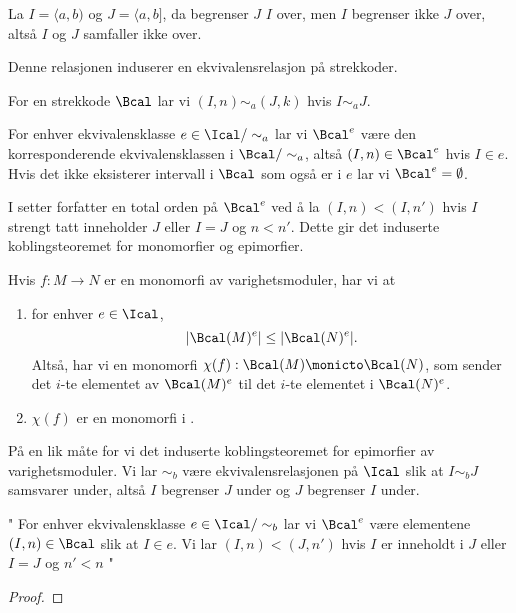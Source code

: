 \begin{bemerk}
  La $I = \langle a,b)$ og $J = \langle a,b]$, da
  begrenser $J$ $I$ over, men $I$ begrenser ikke $J$ over,
  altså $I$ og $J$ samfaller ikke over.
\end{bemerk}

Denne relasjonen induserer en ekvivalensrelasjon på
strekkoder.

\begin{definisjon}\label{def:EkRelBarc}
  For en strekkode $\Bcal$ lar vi $(I,n)\sim_a (J,k)$ hvis
  $I\sim_a J$.
\end{definisjon}

For enhver ekvivalensklasse $e\in\Ical/\sim_a$ lar vi
$\Bcal^e$ være den korresponderende ekvivalensklassen
i $\Bcal/\sim_a$, altså $(I,n)\in\Bcal^e$ hvis $I\in e$.
Hvis det ikke eksisterer intervall i $\Bcal$ som også er
i $e$ lar vi $\Bcal^e=\emptyset$.

I \citep[seksjon 3.2]{Bauer2020} setter forfatter en total orden
på $\Bcal^e$ ved å la $(I,n) < (I,n')$ hvis $I$ strengt tatt
inneholder $J$ eller $I=J$ og $n<n'$. Dette gir det induserte
koblingsteoremet for monomorfier og epimorfier.

\begin{proposisjon}
Hvis $f:M\to N$ er en monomorfi av varighetsmoduler, har vi at
\begin{enumerate}
  \item for enhver $e\in\Ical$,
    \[|\Bcal(M)^e|\leq|\Bcal(N)^e|.\]
    Altså, har vi en monomorfi $\chi(f):\Bcal(M)\monicto\Bcal(N)$,
    som sender det $i$-te elementet av $\Bcal(M)^e$ til det $i$-te
    elementet i $\Bcal(N)^e$.
  \item $\chi(f)$ er en monomorfi i \Barc.
\end{enumerate}
\end{proposisjon}

På en lik måte for vi det induserte koblingsteoremet for
epimorfier av varighetsmoduler. Vi lar $\sim_b$ være
ekvivalensrelasjonen på $\Ical$ slik at $I\sim_b J$
samsvarer under, altså $I$ begrenser $J$ under og $J$
begrenser $I$ under. 


"
For enhver ekvivalensklasse
$e\in\Ical/\sim_b$ lar vi $\Bcal^e$ være elementene
$(I,n)\in\Bcal$ slik at $I\in e$. Vi lar $(I,n)<(J,n')$
hvis $I$ er inneholdt i $J$ eller $I=J$ og $n'<n$
"


\begin{proposisjon}\label{prop:IKTepi}

\end{proposisjon}
\begin{proof}

\end{proof}
